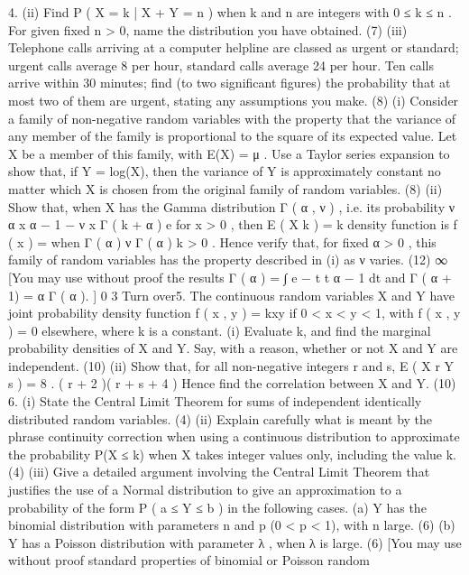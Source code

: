 4.
(ii) Find P ( X = k | X + Y = n ) when k and n are integers with 0 ≤ k ≤ n . For
given fixed n > 0, name the distribution you have obtained.
(7)
(iii) Telephone calls arriving at a computer helpline are classed as urgent or
standard; urgent calls average 8 per hour, standard calls average 24 per hour.
Ten calls arrive within 30 minutes; find (to two significant figures) the
probability that at most two of them are urgent, stating any assumptions you
make.
(8)
(i) Consider a family of non-negative random variables with the property that the
variance of any member of the family is proportional to the square of its
expected value. Let X be a member of this family, with E(X) = μ . Use a
Taylor series expansion to show that, if Y = log(X), then the variance of Y is
approximately constant no matter which X is chosen from the original family
of random variables.
(8)
(ii) Show that, when X has the Gamma distribution Γ ( α , ν ) , i.e. its probability
ν α x α − 1 − ν x
Γ ( k + α )
e for x > 0 , then E ( X k ) = k
density function is f ( x ) =
when
Γ ( α )
ν Γ ( α )
k > 0 . Hence verify that, for fixed α > 0 , this family of random variables has
the property described in (i) as ν varies.
(12)
∞
[You may use without proof the results Γ ( α ) = ∫ e − t t α − 1 dt and Γ ( α + 1) = α Γ ( α ). ]
0
3
Turn over5.
The continuous random variables X and Y have joint probability density function
f ( x , y ) = kxy if 0 < x < y < 1, with f ( x , y ) = 0 elsewhere, where k is a constant.
(i) Evaluate k, and find the marginal probability densities of X and Y. Say, with a
reason, whether or not X and Y are independent.
(10)
(ii) Show that, for all non-negative integers r and s, E ( X r Y s ) =
8
.
( r + 2 )( r + s + 4 )
Hence find the correlation between X and Y.
(10)
6.
(i) State the Central Limit Theorem for sums of independent identically
distributed random variables.
(4)
(ii) Explain carefully what is meant by the phrase continuity correction when
using a continuous distribution to approximate the probability P(X ≤ k) when X
takes integer values only, including the value k.
(4)
(iii) Give a detailed argument involving the Central Limit Theorem that justifies
the use of a Normal distribution to give an approximation to a probability of
the form P ( a ≤ Y ≤ b ) in the following cases.
(a) Y has the binomial distribution with parameters n and p (0 < p < 1),
with n large.
(6)
(b) Y has a Poisson distribution with parameter λ , when λ is large.
(6)
[You may use without proof standard properties of binomial or Poisson random

